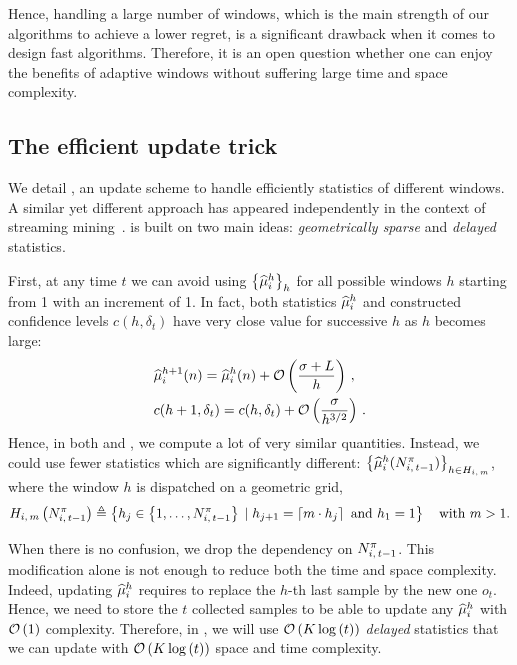 Hence, handling a large number of windows, which is the main strength of our algorithms to achieve a lower regret, is a significant drawback when it comes to design fast algorithms. Therefore, it is an open question whether one can enjoy the benefits of adaptive windows without suffering large time and space complexity. 

\subsection{The efficient update trick}
We detail \EFF, an update scheme to handle efficiently statistics of different windows. A similar yet different approach has appeared independently in the context of streaming mining~\citep{bifet2007learning}. \EFF is built on two main ideas: \emph{geometrically sparse} and \emph{delayed} statistics.

First, at any time $t$ we can avoid using $\left\{\widehat{\mu}_i^h\right\}_{h}$ for all possible windows $h$ starting from 1 with an increment of 1. In fact, both statistics $\widehat{\mu}_i^h$ and constructed confidence levels $c(h, \delta_t)$  have very close value for successive $h$ as $h$ becomes large: 
\begin{align*}
& \widehat{\mu}_i^{h+1}(n) = \widehat{\mu}_i^{h}(n) + \mathcal{O}\left(\frac{\sigma + L}{h}\right)\,,\\
& c(h+1, \delta_t) = c(h, \delta_t) + \mathcal{O}\left(\frac{\sigma }{h^{3/2}}\right) \,.
\end{align*}
Hence, in both \FEWA and \RUCB, we compute a lot of very similar quantities. Instead, we could use fewer statistics which are significantly different: $\left\{\widehat{\mu}_i^h(N_{i,\,t-1}^\pi)\right\}_{h\in H_{i,\,m}}$, where the window $h$ is dispatched on a geometric grid, 
 \[H_{i,\,m}\left(N_{i,\,t-1}^\pi\right) \triangleq \left\{ h_j \in  \left\{1, \dots , N_{i,\,t-1}^\pi \right\} \;|\; h_{j+1} = \left\lceil m \cdot h_j\right\rceil \text{ and } h_1 = 1\right\}\quad \text{with } m > 1.\]

When there is no confusion, we drop the dependency on $N_{i,\,t-1}^\pi$.  This modification alone is not enough to reduce both the time and space complexity. Indeed, updating $\widehat{\mu}^h_{i}$ requires to replace the $h$-th last sample by the new one $o_t$. Hence, we need to store the $t$ collected samples to be able to update any $\widehat{\mu}^h_{i}$  with $\mathcal{O}\left(1\right)$ complexity. Therefore, in \EFF, we will use $\mathcal{O}\left(K\log\left(t\right)\right)$ \emph{delayed} statistics that we can update with $\mathcal{O}\left(K\log\left(t\right)\right)$ space and time complexity.

